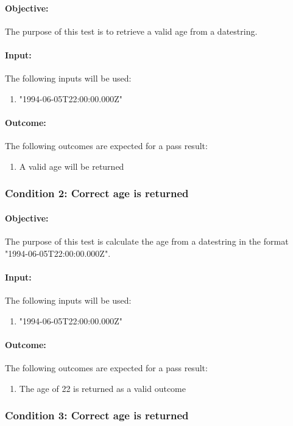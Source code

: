 \documentclass{article}
\begin{document}
\paragraph{Objective:} The purpose of this test is to retrieve a valid age from a datestring.
\paragraph{Input:} The following inputs will be used:
\begin{enumerate}
	\item "1994-06-05T22:00:00.000Z"
\end{enumerate}
\paragraph{Outcome:} The following outcomes are expected for a pass result:
\begin{enumerate}
	\item A valid age will be returned
\end{enumerate}
\subsubsection{Condition 2: Correct age is returned  }
\paragraph{Objective:}  The purpose of this test is calculate the age from a datestring in the format "1994-06-05T22:00:00.000Z".
\paragraph{Input:} The following inputs will be used:
\begin{enumerate}
	\item "1994-06-05T22:00:00.000Z"
\end{enumerate}
\paragraph{Outcome:} The following outcomes are expected for a pass result:
\begin{enumerate}
	\item The age of 22 is returned as a valid outcome
\end{enumerate}
\subsubsection{Condition 3: Correct age is returned  }
\end{document}
